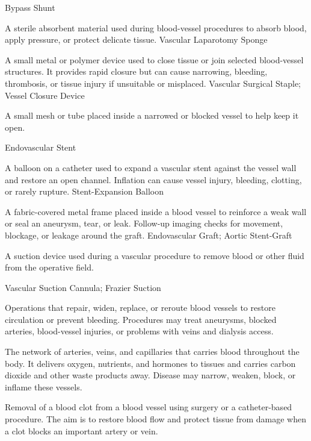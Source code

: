\synonyms
Bypass Shunt

 A sterile absorbent material used during blood-vessel procedures to absorb blood, apply pressure, or protect delicate tissue.
\synonyms
Vascular Laparotomy Sponge

 A small metal or polymer device used to close tissue or join selected blood-vessel structures. It provides rapid closure but can cause narrowing, bleeding, thrombosis, or tissue injury if unsuitable or misplaced.
\synonyms
Vascular Surgical Staple; Vessel Closure Device

 A small mesh or tube placed inside a narrowed or blocked vessel to help keep it open.

\synonyms
Endovascular Stent

 A balloon on a catheter used to expand a vascular stent against the vessel wall and restore an open channel. Inflation can cause vessel injury, bleeding, clotting, or rarely rupture.
\synonyms
Stent-Expansion Balloon

 A fabric-covered metal frame placed inside a blood vessel to reinforce a weak wall or seal an aneurysm, tear, or leak. Follow-up imaging checks for movement, blockage, or leakage around the graft.
\synonyms
Endovascular Graft; Aortic Stent-Graft

 A suction device used during a vascular procedure to remove blood or other fluid from the operative
field.

\synonyms
Vascular Suction Cannula; Frazier Suction

 Operations that repair, widen, replace, or reroute blood vessels to restore circulation or prevent bleeding. Procedures may treat aneurysms, blocked arteries, blood-vessel injuries, or problems with veins and dialysis access.

 The network of arteries, veins, and capillaries that carries blood throughout the body. It delivers oxygen, nutrients, and hormones to tissues and carries carbon dioxide and other waste products away. Disease may narrow, weaken, block, or inflame these vessels.

 Removal of a blood clot from a blood vessel using surgery or a catheter-based procedure. The aim is to restore blood flow and protect tissue from damage when a clot blocks an important artery or vein.


